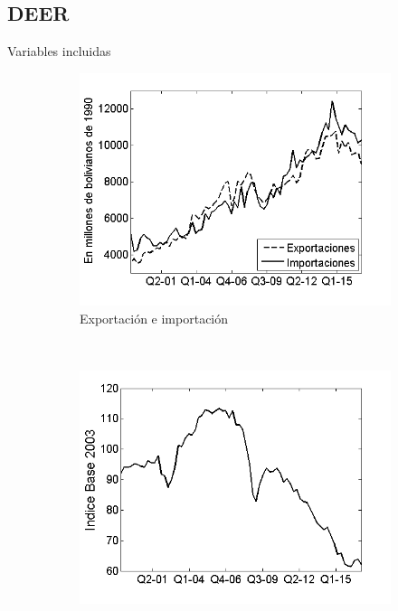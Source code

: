 \documentclass[12pt]{beamer}
\begin{document}
\subsection[DEER]{DEER}
\begin{frame}{Variables incluidas}
\begin{figure}
\centering
    \begin{subfigure}[b]{0.3\textwidth}
        \includegraphics[width=\textwidth]{1xm}
        \caption{\tiny Exportación e importación}
        \label{1xm}
    \end{subfigure}
    ~ %
    \begin{subfigure}[b]{0.3\textwidth}
        \includegraphics[width=\textwidth]{3tcr}

\end{subfigure}
\end{figure}
\end{frame}
\end{document}
